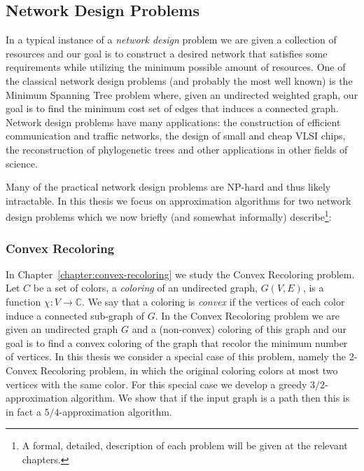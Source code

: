 \subsection*{Network Design Problems}
In a typical instance of a \emph{network design} problem we are given a collection of resources and our goal is to construct a desired network that satisfies some requirements while utilizing the minimum possible amount of resources.
One of the classical network design problems (and probably the most well known) is the Minimum Spanning Tree problem where, given an undirected weighted graph, our goal is to find the minimum cost set of edges that induces a connected graph.
Network design problems have many applications: the construction of efficient communication and traffic networks, the design of small and cheap VLSI chips, the reconstruction of phylogenetic trees and other applications in other fields of science.

Many of the practical network design problems are NP-hard and thus likely intractable. 
In this thesis we focus on approximation algorithms for two network design problems which we now briefly (and somewhat informally) describe\footnote{A formal, detailed, description of each problem will be given at the relevant chapters.}:


\subsubsection*{Convex Recoloring} 
In Chapter~\ref{chapter:convex-recoloring} we study the Convex Recoloring problem.
Let $C$ be a set of colors, a \emph{coloring} of an undirected graph, $G(V, E)$, is a function $\chi:V \to \mathbb{C}$.
We say that a coloring is \emph{convex} if the vertices of each color induce a connected sub-graph of $G$.
In the Convex Recoloring problem we are given an undirected graph $G$ and a (non-convex) coloring of this graph and our goal is to find a convex coloring of the graph that recolor the minimum number of vertices.
In this thesis we consider a special case of this problem, namely the 2-Convex Recoloring problem, in which the original coloring colors at most two vertices with the same color.
For this special case we develop a greedy $3/2$-approximation algorithm.
We show that if the input graph is a path then this is in fact a $5/4$-approximation algorithm.


